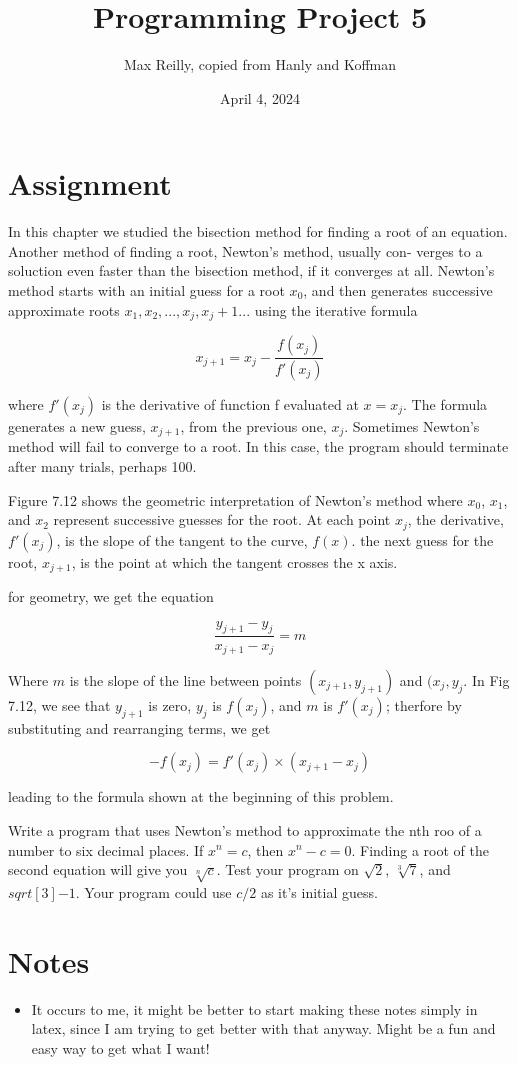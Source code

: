 \documentclass{article}
\title{Programming Project 5}
\author{Max Reilly, copied from Hanly and Koffman}
\date{April 4, 2024}
\begin{document}
\maketitle
\section{Assignment}
In this chapter we studied the bisection method for finding a root of an equation.
Another method of finding a root, Newton's method, usually con-
verges to a soluction even faster than the bisection method, if it converges at
all. Newton's method starts with an initial guess for a root $x_0$, and then
generates successive approximate roots $x_1, x_2, . . . , x_j, x_j+1 . . .$ using the
iterative formula

$$
x_{j+1} = x_j - \frac{f(x_j)}{f'(x_j)}
$$

where $f'(x_j)$ is the derivative of function f evaluated at $x = x_j$. The formula
generates a new guess, $x_{j+1}$, from the previous one, $x_{j}$. Sometimes Newton's
method will fail to converge to a root. In this case, the program should terminate
after many trials, perhaps 100.

Figure 7.12 shows the geometric interpretation of Newton's method where
$x_0$, $x_1$, and $x_2$ represent successive guesses for the root. At each point $x_j$, the
derivative, $f'(x_j)$, is the slope of the tangent to the curve, $f(x)$. the next guess
for the root, $x_{j+1}$, is the point at which the tangent crosses the x axis.

for geometry, we get the equation

$$
\frac{y_{j+1} - y_j}{x_{j+1} - x_j} = m
$$


Where $m$ is the slope of the line between points $(x_{j+1}, y_{j+1})$ and $(x_j, y_j$. In Fig
7.12, we see that $y_{j+1}$ is zero, $y_j$ is $f(x_j)$, and $m$ is $f'(x_j)$; therfore by substituting
and rearranging terms, we get

$$
-f(x_j) = f'(x_j) \times (x_{j+1} - x_j)
$$

leading to the formula shown at the beginning of this problem.

Write a program that uses Newton's method to approximate the nth roo of
a number to six decimal places. If $x^n = c$, then $x^n -c = 0$. Finding a root of
the second equation will give you $\sqrt[n]{c}$. Test your program on $\sqrt{2}$, $\sqrt[3]{7}$, and
$sqrt[3]{-1}$. Your program could use $c/2$ as it's initial guess.

\section{Notes}
\begin{itemize}
    \item It occurs to me, it might be better to start making these notes simply in latex, since I am
            trying to get better with that anyway. Might be a fun and easy way to get what I want!
\end{itemize}
\end{document}
